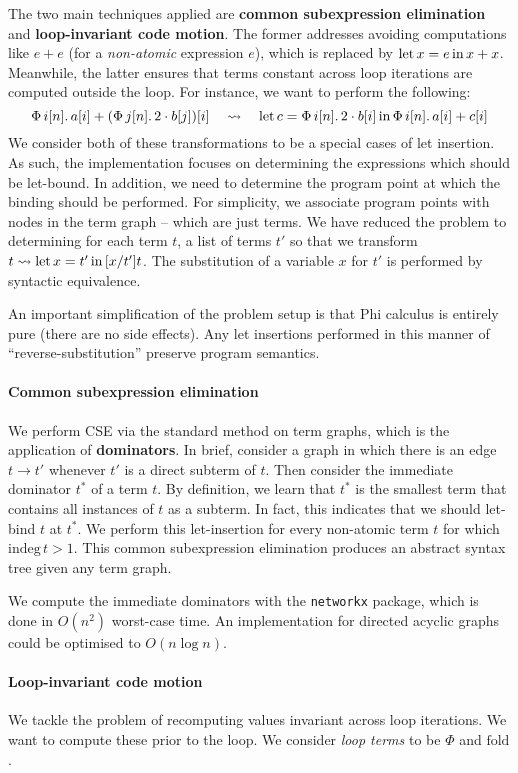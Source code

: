 The two main techniques applied are \textbf{common subexpression elimination} and \textbf{loop-invariant code motion}. The former addresses avoiding computations like $e + e$ (for a \textit{non-atomic} expression $e$), which is replaced by $\mathrm{let}\,{x}={e}\,\mathrm{in}\,{x + x}$. Meanwhile, the latter ensures that terms constant across loop iterations are computed outside the loop. For instance, we want to perform the following:
$$ 
\phivec{i}{n}{a[i] + \left( \phivec{j}{n}{2 \cdot b[j]} \right)[i]} \quad\leadsto\quad \philet{c}{\phivec{i}{n}{2 \cdot b[i]}}{\phivec{i}{n}{a[i] + c[i]}} 
$$
We consider both of these transformations to be a special cases of let insertion. As such, the implementation focuses on determining the expressions which should be let-bound. In addition, we need to determine the program point at which the binding should be performed. For simplicity, we associate program points with nodes in the term graph -- which are just terms. We have reduced the problem to determining for each term $t$, a list of terms $t'$ so that we transform $t \leadsto \mathrm{let}\,{x}={t'}\,\mathrm{in}\,{[x/t']t}$. The substitution of a variable $x$ for $t'$ is performed by syntactic equivalence.

An important simplification of the problem setup is that Phi calculus is entirely pure (there are no side effects). Any let insertions performed in this manner of ``reverse-substitution'' preserve program semantics.

\paragraph{Common subexpression elimination} We perform CSE via the standard method on term graphs, which is the application of \textbf{dominators}. In brief, consider a graph in which there is an edge $t \to t'$ whenever $t'$ is a direct subterm of $t$. Then consider the immediate dominator  $t^*$ of a term $t$. By definition, we learn that $t^*$ is the smallest term that contains all instances of $t$ as a subterm. In fact, this indicates that we should let-bind $t$ at $t^*$. We perform this let-insertion for every non-atomic term $t$ for which $\mathrm{indeg}\,t > 1$. This common subexpression elimination produces an abstract syntax tree given any term graph.

We compute the immediate dominators with the \texttt{networkx} package, which is done in $O(n^2)$ worst-case time. An implementation for directed acyclic graphs could be optimised to $O(n \log n)$.

\paragraph{Loop-invariant code motion} We tackle the problem of recomputing values invariant across loop iterations. We want to compute these prior to the loop. We consider \textit{loop terms} to be $\Phi$ and $\mathrm{fold}$. 


